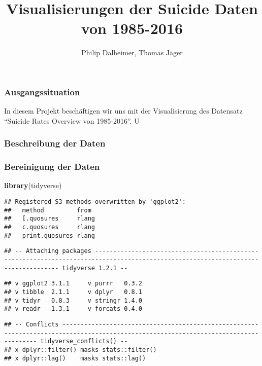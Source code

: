 \documentclass[]{article}
\title{Visualisierungen der Suicide Daten von 1985-2016}
\author{Philip Dalheimer, Thomas Jäger}
\date{}
\newenvironment{Shaded}{\begin{snugshade}}{\end{snugshade}}
\newcommand{\KeywordTok}[1]{\textcolor[rgb]{0.13,0.29,0.53}{\textbf{#1}}}
\newcommand{\NormalTok}[1]{#1}
\begin{document}
\maketitle

\hypertarget{ausgangssituation}{%
\subsubsection{Ausgangssituation}\label{ausgangssituation}}

In diesem Projekt beschäftigen wir uns mit der Visualisierung des
Datensatz ``Suicide Rates Overview von 1985-2016''. U

\hypertarget{beschreibung-der-daten}{%
\subsubsection{Beschreibung der Daten}\label{beschreibung-der-daten}}

\hypertarget{bereinigung-der-daten}{%
\subsubsection{Bereinigung der Daten}\label{bereinigung-der-daten}}

\begin{Shaded}
\begin{Highlighting}[]
\KeywordTok{library}\NormalTok{(tidyverse)}
\end{Highlighting}
\end{Shaded}

\begin{verbatim}
## Registered S3 methods overwritten by 'ggplot2':
##   method         from 
##   [.quosures     rlang
##   c.quosures     rlang
##   print.quosures rlang
\end{verbatim}

\begin{verbatim}
## -- Attaching packages ---------------------------------------------------------------------------------------------------------------------------------- tidyverse 1.2.1 --
\end{verbatim}

\begin{verbatim}
## v ggplot2 3.1.1     v purrr   0.3.2
## v tibble  2.1.1     v dplyr   0.8.1
## v tidyr   0.8.3     v stringr 1.4.0
## v readr   1.3.1     v forcats 0.4.0
\end{verbatim}

\begin{verbatim}
## -- Conflicts ------------------------------------------------------------------------------------------------------------------------------------- tidyverse_conflicts() --
## x dplyr::filter() masks stats::filter()
## x dplyr::lag()    masks stats::lag()
\end{verbatim}
\end{document}
